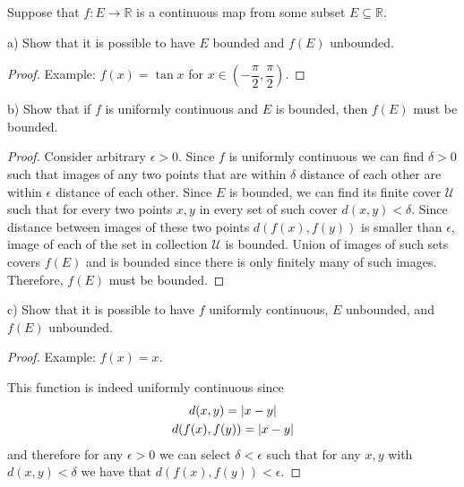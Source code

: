 \documentclass{article}
\newcommand{\R}{\mathbb{R}}
\DeclarePairedDelimiter{\abs}{\lvert}{\rvert}
\begin{document}
\begin{tcolorbox}
Suppose that $f : E \to \R$ is a continuous map from some subset $E \subseteq \R$.

a) Show that it is possible to have $E$ bounded and $f(E)$ unbounded.
\end{tcolorbox}

\begin{proof}

Example: $f(x) = \tan x$ for $x \in \left( -\dfrac{\pi}{2}, \dfrac{\pi}{2} \right)$.

\end{proof}

\begin{tcolorbox}
b) Show that if $f$ is uniformly continuous and $E$ is bounded, then $f(E)$ must be bounded.
\end{tcolorbox}

\begin{proof}

Consider arbitrary $\epsilon>0$.
Since $f$ is uniformly continuous we can find $\delta>0$ such that images of any two points that are within $\delta$ distance of each other are within $\epsilon$ distance of each other.
Since $E$ is bounded, we can find its finite cover $\mathcal{U}$ such that for every two points $x,y$ in every set of such cover $d(x,y) < \delta$.
Since distance between images of these two points $d(f(x), f(y))$ is smaller than $\epsilon$, image of each of the set in collection $\mathcal{U}$ is bounded.
Union of images of such sets covers $f(E)$ and is bounded since there is only finitely many of such images.
Therefore, $f(E)$ must be bounded.

\end{proof}

\begin{tcolorbox}
c) Show that it is possible to have $f$ uniformly continuous, $E$ unbounded, and $f(E)$ unbounded.
\end{tcolorbox}

\begin{proof}

Example: $f(x) = x$.

This function is indeed uniformly continuous since
\begin{gather*}
    d(x,y) = \abs{x-y} \\
    d(f(x),f(y)) = \abs{x-y}    
\end{gather*}
and therefore for any $\epsilon > 0$ we can select $\delta < \epsilon$ such that for any $x, y$ with $d(x,y)<\delta$ we have that $d(f(x),f(y)) < \epsilon$.

\end{proof}
\end{document}
